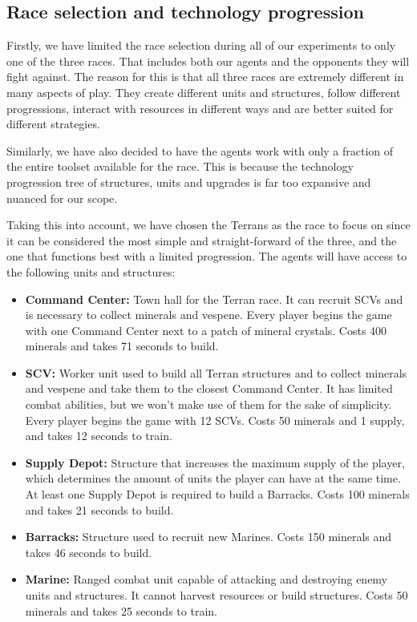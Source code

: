 \subsection{Race selection and technology progression}

Firstly, we have limited the race selection during all of our experiments to only one of the three races. That includes both our agents and the opponents they will fight against. The reason for this is that all three races are extremely different in many aspects of play. They create different units and structures, follow different progressions, interact with resources in different ways and are better suited for different strategies.

Similarly, we have also decided to have the agents work with only a fraction of the entire toolset available for the race. This is because the technology progression tree of structures, units and upgrades is far too expansive and nuanced for our scope.

Taking this into account, we have chosen the Terrans as the race to focus on since it can be considered the most simple and straight-forward of the three, and the one that functions best with a limited progression. The agents will have access to the following units and structures:

\begin{itemize}
    \item \textbf{Command Center:} Town hall for the Terran race. It can recruit SCVs and is necessary to collect minerals and vespene. Every player begins the game with one Command Center next to a patch of mineral crystals. Costs 400 minerals and takes 71 seconds to build.
    \item \textbf{SCV:} Worker unit used to build all Terran structures and to collect minerals and vespene and take them to the closest Command Center. It has limited combat abilities, but we won't make use of them for the sake of simplicity. Every player begins the game with 12 SCVs. Costs 50 minerals and 1 supply, and takes 12 seconds to train.
    \item \textbf{Supply Depot:} Structure that increases the maximum supply of the player, which determines the amount of units the player can have at the same time. At least one Supply Depot is required to build a Barracks. Costs 100 minerals and takes 21 seconds to build.
    \item \textbf{Barracks:} Structure used to recruit new Marines. Costs 150 minerals and takes 46 seconds to build.
    \item \textbf{Marine:} Ranged combat unit capable of attacking and destroying enemy units and structures. It cannot harvest resources or build structures. Costs 50 minerals and takes 25 seconds to train.
\end{itemize}

